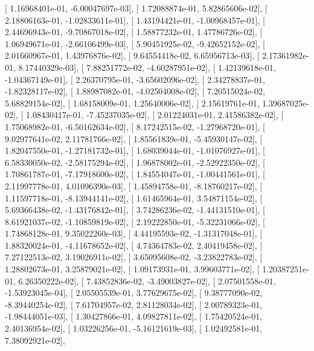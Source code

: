 \documentclass{article}
\begin{document}
       [  1.16968401e-01,  -6.00047697e-03],
       [  1.72088874e-01,   5.82865606e-02],
       [  2.18806163e-01,  -1.02833611e-01],
       [  1.43194421e-01,  -1.00968457e-01],
       [  2.44696943e-01,  -9.70867018e-02],
       [  1.58877232e-01,   1.47786726e-02],
       [  1.06949671e-01,  -2.66106499e-03],
       [  5.90451925e-02,  -9.42652152e-02],
       [  2.01660967e-01,   1.43976876e-02],
       [  9.64554418e-02,   6.65956713e-03],
       [  2.17361982e-01,   8.17440329e-03],
       [  7.88251772e-02,  -4.60287951e-02],
       [  1.42139618e-01,  -1.04367149e-01],
       [  2.26370795e-01,  -3.65602096e-02],
       [  2.34278837e-01,  -1.82328117e-02],
       [  1.88987082e-01,  -4.02504008e-02],
       [  7.20515024e-02,   5.68829154e-02],
       [  1.68158009e-01,   1.25640006e-02],
       [  2.15619761e-01,   1.39687025e-02],
       [  1.08430417e-01,  -7.45237035e-02],
       [  2.01224031e-01,   2.41586382e-02],
       [  1.75068982e-01,  -6.50162634e-02],
       [  8.17242515e-02,  -1.27968720e-01],
       [  9.02977641e-02,   2.11781766e-02],
       [  1.85561839e-01,  -5.45930147e-02],
       [  1.82047550e-01,  -1.27181732e-01],
       [  1.68039044e-01,  -1.01076927e-01],
       [  6.58330050e-02,  -2.58175294e-02],
       [  1.96878002e-01,  -2.52922350e-02],
       [  1.70861787e-01,  -7.17918600e-02],
       [  1.84554047e-01,  -1.00441561e-01],
       [  2.11997778e-01,   4.01096390e-03],
       [  1.45894758e-01,  -8.18760217e-02],
       [  1.11597718e-01,  -8.13944141e-02],
       [  1.61465964e-01,   3.54871154e-02],
       [  5.69366438e-02,  -1.43176842e-01],
       [  3.74286236e-02,  -1.44131510e-01],
       [  8.61921037e-02,  -1.10859819e-02],
       [  2.19222850e-01,  -5.32231066e-02],
       [  1.74868128e-01,   9.35022260e-03],
       [  4.44195593e-02,  -1.31317048e-01],
       [  1.88320024e-01,  -4.11678652e-02],
       [  4.74364783e-02,   2.40419458e-02],
       [  7.27122513e-02,   3.19026911e-02],
       [  3.65095608e-02,  -3.23822783e-02],
       [  1.28802673e-01,   3.25879021e-02],
       [  1.09173931e-01,   3.99603771e-02],
       [  1.20387251e-01,   6.26350222e-02],
       [  7.43852836e-02,  -3.49003827e-02],
       [  2.07501558e-01,  -1.53923045e-04],
       [  2.05505539e-01,   3.77629675e-02],
       [  9.38777090e-02,  -8.39440254e-02],
       [  7.61704957e-02,   2.81128034e-02],
       [  2.00789323e-01,  -1.98444051e-03],
       [  1.30427866e-01,   4.09827811e-02],
       [  1.75420524e-01,   2.40136954e-02],
       [  1.03226256e-01,  -5.16121619e-03],
       [  1.02492581e-01,   7.38092921e-02],
\end{document}
